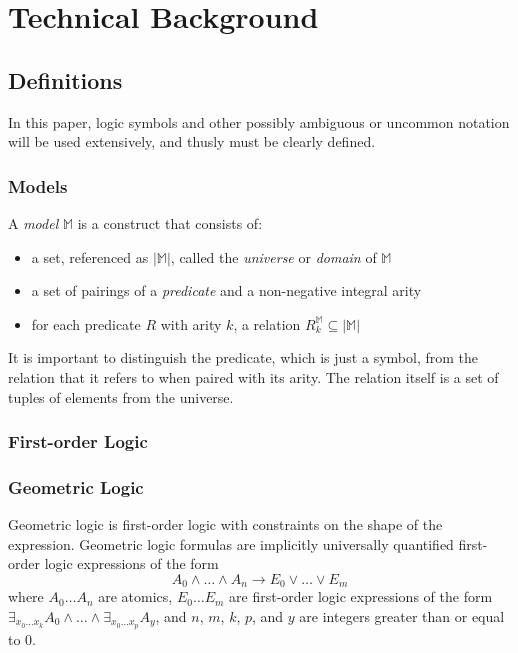 \section{Technical Background}

	\subsection{Definitions}

	In this paper, logic symbols and other possibly ambiguous or uncommon
	notation will be used extensively, and thusly must be clearly defined.

		\subsubsection{Models}

		A \emph{model} $\mathbb{M}$ is a construct that consists of:
			\begin{itemize}
			\item a set, referenced as $|\mathbb{M}|$, called the \emph{universe} or \emph{domain} of $\mathbb{M}$
			\item a set of pairings of a \emph{predicate} and a non-negative integral arity
			\item for each predicate $R$ with arity $k$, a relation $R^\mathbb{M}_k \subseteq |\mathbb{M}|$
			\end{itemize}
		It is important to distinguish the predicate, which is just a symbol,
		from the relation that it refers to when paired with its arity. The
		relation itself is a set of tuples of elements from the universe.

		\subsubsection{First-order Logic}

		

		\subsubsection{Geometric Logic}

		Geometric logic is first-order logic with constraints on the shape of
		the expression.  Geometric logic formulas are implicitly universally
		quantified first-order logic expressions of the form \[A_0 \wedge
		\ldots \wedge A_n \to E_0 \vee \ldots \vee E_m\] where $A_0 \ldots A_n$
		are atomics, $E_0 \ldots E_m$ are first-order logic expressions of the
		form $\exists_{x_0 \ldots x_k} A_0 \wedge \ldots \wedge \exists_{x_0
		\ldots x_p} A_y$, and $n$, $m$, $k$, $p$, and $y$ are integers greater
		than or equal to $0$.

